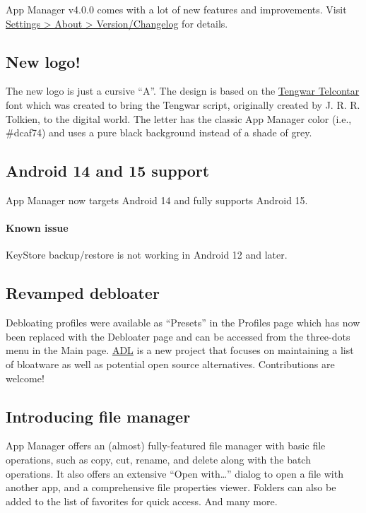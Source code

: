 App Manager v4.0.0 comes with a lot of new features and improvements. Visit
\href{app-manager://settings/about/version}{Settings > About > Version/Changelog} for details.

\subsection{New logo!}
The new logo is just a cursive ``A''. The design is based on the
\href{https://freetengwar.sourceforge.net/}{Tengwar Telcontar} font which was created to bring the
Tengwar script, originally created by J. R. R. Tolkien, to the digital world. The letter has the
classic App Manager color (i.e., \#dcaf74) and uses a pure black background instead of a shade of
grey.

\subsection{Android 14 and 15 support}
App Manager now targets Android 14 and fully supports Android 15.

\paragraph{Known issue} KeyStore backup/restore is not working in Android 12 and later.

\subsection{Revamped debloater}
Debloating profiles were available as ``Presets'' in the Profiles page which has now been replaced
with the Debloater page and can be accessed from the three-dots menu in the Main page.
\href{https://github.com/MuntashirAkon/android-debloat-list}{ADL} is a new project that focuses on
maintaining a list of bloatware as well as potential open source alternatives. Contributions are
welcome!

\subsection{Introducing file manager}
App Manager offers an (almost) fully-featured file manager with basic file operations, such as copy,
cut, rename, and delete along with the batch operations. It also offers an extensive ``Open with\dots''
dialog to open a file with another app, and a comprehensive file properties viewer. Folders can also
be added to the list of favorites for quick access. And many more.

